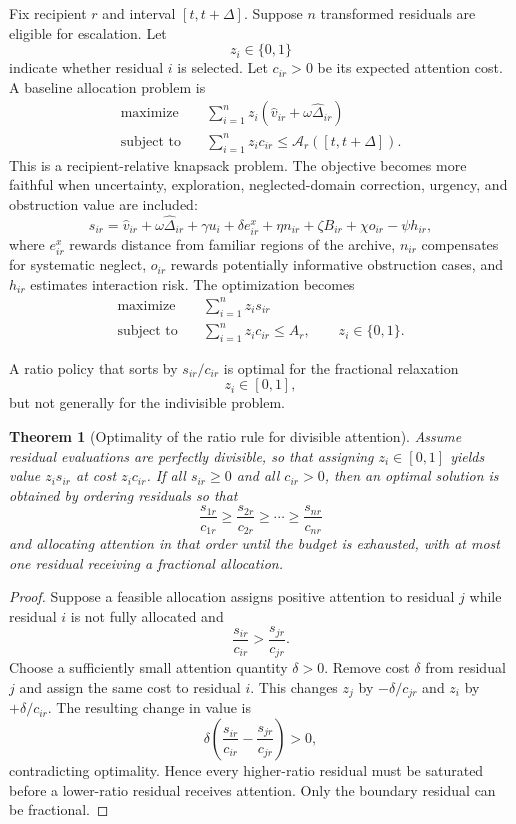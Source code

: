 \documentclass[11pt]{article}
\newtheorem{theorem}[definition]{Theorem}
\theoremstyle{definition}
\newcommand{\A}{\mathcal{A}}
\begin{document}
Fix recipient \(r\) and interval \([t,t+\Delta]\). Suppose \(n\) transformed residuals are eligible for escalation. Let
\[
z_i\in\{0,1\}
\]
indicate whether residual \(i\) is selected. Let \(c_{ir}>0\) be its expected attention cost. A baseline allocation problem is
\[
\begin{aligned}
\text{maximize}\quad
&
\sum_{i=1}^{n}
z_i
\left(
\widehat{v}_{ir}
+
\omega\widehat{\Delta}_{ir}
\right)
\\
\text{subject to}\quad
&
\sum_{i=1}^{n}
z_i c_{ir}
\leq
\A_r([t,t+\Delta]).
\end{aligned}
\]
This is a recipient-relative knapsack problem. The objective becomes more faithful when uncertainty, exploration, neglected-domain correction, urgency, and obstruction value are included:
\[
s_{ir}
=
\widehat{v}_{ir}
+
\omega\widehat{\Delta}_{ir}
+
\gamma u_i
+
\delta e_{ir}^{x}
+
\eta n_{ir}
+
\zeta B_{ir}
+
\chi o_{ir}
-
\psi h_{ir},
\]
where \(e_{ir}^{x}\) rewards distance from familiar regions of the archive, \(n_{ir}\) compensates for systematic neglect, \(o_{ir}\) rewards potentially informative obstruction cases, and \(h_{ir}\) estimates interaction risk. The optimization becomes
\[
\begin{aligned}
\text{maximize}\quad
&
\sum_{i=1}^{n}z_i s_{ir}
\\
\text{subject to}\quad
&
\sum_{i=1}^{n}z_i c_{ir}\leq A_r,
\qquad
z_i\in\{0,1\}.
\end{aligned}
\]

A ratio policy that sorts by \(s_{ir}/c_{ir}\) is optimal for the fractional relaxation
\[
z_i\in[0,1],
\]
but not generally for the indivisible problem.

\begin{theorem}[Optimality of the ratio rule for divisible attention]
Assume residual evaluations are perfectly divisible, so that assigning \(z_i\in[0,1]\) yields value \(z_i s_{ir}\) at cost \(z_i c_{ir}\). If all \(s_{ir}\geq0\) and all \(c_{ir}>0\), then an optimal solution is obtained by ordering residuals so that
\[
\frac{s_{1r}}{c_{1r}}
\geq
\frac{s_{2r}}{c_{2r}}
\geq
\cdots
\geq
\frac{s_{nr}}{c_{nr}}
\]
and allocating attention in that order until the budget is exhausted, with at most one residual receiving a fractional allocation.
\end{theorem}

\begin{proof}
Suppose a feasible allocation assigns positive attention to residual \(j\) while residual \(i\) is not fully allocated and
\[
\frac{s_{ir}}{c_{ir}}
>
\frac{s_{jr}}{c_{jr}}.
\]
Choose a sufficiently small attention quantity \(\delta>0\). Remove cost \(\delta\) from residual \(j\) and assign the same cost to residual \(i\). This changes \(z_j\) by \(-\delta/c_{jr}\) and \(z_i\) by \(+\delta/c_{ir}\). The resulting change in value is
\[
\delta
\left(
\frac{s_{ir}}{c_{ir}}
-
\frac{s_{jr}}{c_{jr}}
\right)
>0,
\]
contradicting optimality. Hence every higher-ratio residual must be saturated before a lower-ratio residual receives attention. Only the boundary residual can be fractional.
\end{proof}
\end{document}
